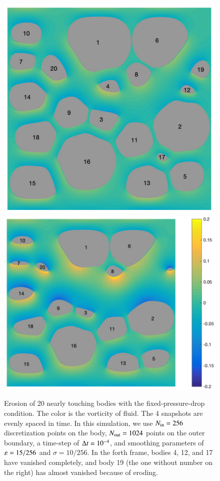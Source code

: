 \documentclass[preprint, 10pt]{elsarticle}
\begin{document}
\begin{figure}[H]
\begin{center}
\includegraphics[width = 0.42 \textwidth]{./figs/20b_dense201}
\includegraphics[width = 0.507 \textwidth]{./figs/20b_dense301}
\caption{\label{fig:Eroding20vort} Erosion of 20 nearly touching bodies with the fixed-pressure-drop condition. The color is the vorticity of fluid. The 4 snapshots are evenly spaced in time. In this simulation, we use $N_{\mathrm{in}} = 256$ discretization points on the body, $N_{\mathrm{out}} = 1024$ points on the outer boundary, a time-step of $\Delta t=10^{-4}$, and smoothing parameters of $\varepsilon= 15/256$ and $\sigma=10/256 $. In the forth frame, bodies 4, 12, and 17 have vanished completely, and body 19 (the one without number on the right) has almost vanished because of eroding.}
\end{center}
\end{figure}
\end{document}
